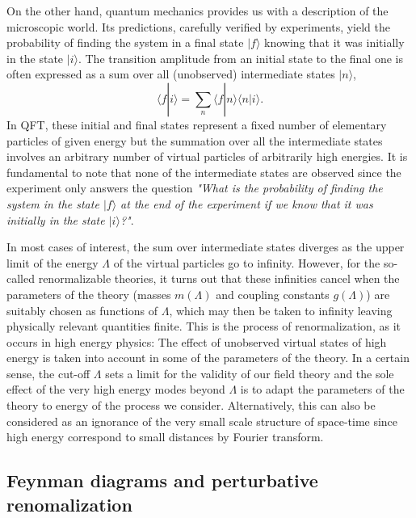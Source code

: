 \documentclass[12pt,here,feynmf]{article}
\begin{document}
On the other hand, quantum mechanics provides us with a description of the microscopic world. Its predictions, carefully verified by experiments, yield the probability of finding the system in a final state $|f\rangle$ knowing that it was initially in the state $|i\rangle$. The transition amplitude from an initial state to the final one is often expressed as a sum over all (unobserved) intermediate states $|n\rangle$,
\begin{equation}
\langle f|i\rangle=\sum_{n}\langle f|n\rangle\langle n|i\rangle.
\end{equation}
In QFT, these initial and final states represent a fixed number of elementary particles of given energy but the summation over all the intermediate states involves an arbitrary number of virtual particles of arbitrarily high energies. It is fundamental to note that none of the intermediate states are observed since the experiment only answers the question \emph{"What is the probability of finding the system in the state $|f\rangle $ at  the end of the experiment if we know that it was initially in the state $|i\rangle$?"}.  

In most cases of interest, the sum over intermediate states diverges as the upper limit of the energy $\Lambda$ of the virtual particles go to infinity. However, for the so-called renormalizable theories, it turns out that these infinities cancel  when the parameters of the theory (masses $m(\Lambda)$ and coupling constants  $g(\Lambda)$) are suitably chosen as functions of  $\Lambda$, which may then be taken to infinity leaving physically relevant quantities finite. This is the process of renormalization, as it occurs in high energy physics: The effect of unobserved virtual states of high energy is taken into account in some of the parameters of the theory. In a certain sense, the cut-off $\Lambda$ sets a limit for the validity of our field theory  and the sole effect of the very high energy modes beyond $\Lambda$ is to adapt the parameters of the theory to energy of the process we consider.  Alternatively, this can also be considered as an ignorance of the very small scale structure of space-time since high energy correspond to small distances by Fourier transform.

\subsection{Feynman diagrams and perturbative renomalization}
\end{document}
